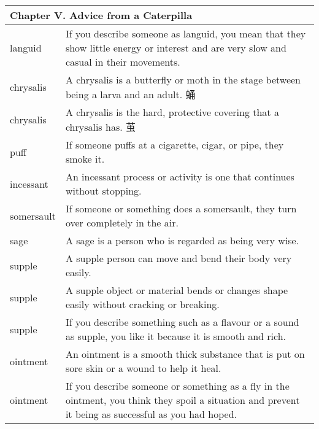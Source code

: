 \documentclass{ctexart}
\begin{document}
\begin{center}
\begin{longtable}{|l|p{7.8cm}|}

\hline
\multicolumn{2}{|l|}{\textbf{Chapter V. Advice from a Caterpilla}}\\

\hline
languid
&
If you describe someone as languid, you mean that they show little energy or interest and are very slow and casual in their movements.
\\

\hline
chrysalis
&
A chrysalis is a butterfly or moth in the stage between being a larva and an adult. 蛹
\\

\hline
chrysalis
&
A chrysalis is the hard, protective covering that a chrysalis has. 茧
\\


\hline
puff
&
If someone puffs at a cigarette, cigar, or pipe, they smoke it.
\\

\hline
incessant
&
An incessant process or activity is one that continues without stopping.
\\

\hline
somersault
&
If someone or something does a somersault, they turn over completely in the air.
\\

\hline
sage
&
A sage is a person who is regarded as being very wise.
\\

\hline
supple
&
A supple person can move and bend their body very easily.
\\

\hline
supple
&
A supple object or material bends or changes shape easily without cracking or breaking.
\\

\hline
supple
&
If you describe something such as a flavour or a sound as supple, you like it because it is smooth and rich.
\\


\hline
ointment
&
An ointment is a smooth thick substance that is put on sore skin or a wound to help it heal.
\\

\hline
ointment
&
If you describe someone or something as a fly in the ointment, you think they spoil a situation and prevent it being as successful as you had hoped.
\\



\end{longtable}
\end{center}
\end{document}
